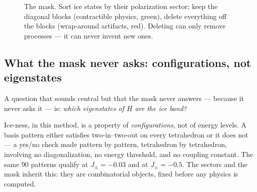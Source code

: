 \documentclass[11pt,a4paper]{article}
\newcommand{\Jpm}{J_{\pm}}
\begin{document}
\begin{figure}[h]
\centering
{}
\caption{The mask.  Sort ice states by their polarization sector; keep the
diagonal blocks (contractible physics, green), delete everything off the
blocks (wrap-around artifacts, red).  Deleting can only remove processes ---
it can never invent new ones.}
\label{fig:mask}
\end{figure}

\subsection{What the mask never asks: configurations, not eigenstates}
\label{sec:configs}

A question that sounds central but that the mask never answers --- because
it never asks it --- is: \emph{which eigenstates of $H$ are the ice band?}

Ice-ness, in this method, is a property of \emph{configurations}, not of
energy levels.  A basis pattern either satisfies two-in--two-out on every
tetrahedron or it does not --- a yes/no check made pattern by pattern,
tetrahedron by tetrahedron, involving no diagonalization, no energy
threshold, and no coupling constant.  The same 90 patterns qualify at
$\Jpm=-0.03$ and at $\Jpm=-0.5$.  The sectors and the mask inherit this:
they are combinatorial objects, fixed before any physics is computed.
\end{document}
